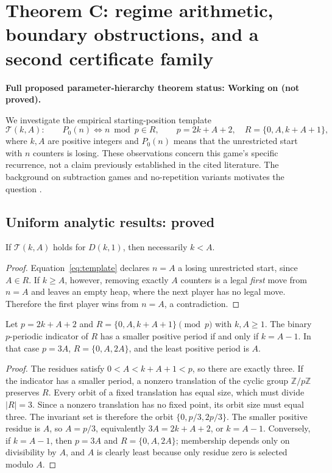 \section{Theorem C: regime arithmetic, boundary obstructions, and a second certificate family}\label{sec:C}
\textbf{Full proposed parameter-hierarchy theorem status: Working on (not proved).}

We investigate the empirical starting-position template
\begin{equation}\label{eq:template}
\mathcal{T}(k,A):\qquad P_0(n)\iff n\bmod p\in R,\qquad
p=2k+A+2,\quad R=\{0,A,k+A+1\},
\end{equation}
where $k,A$ are positive integers and $P_0(n)$ means that the unrestricted start with $n$ counters is losing. These observations concern this game's specific recurrence, not a claim previously established in the cited literature. The background on subtraction games and no-repetition variants motivates the question \cite{winningways2001,gurvich2012}.

\subsection{Uniform analytic results: proved}
\begin{proposition}\label{prop:Cupper}
If $\mathcal{T}(k,A)$ holds for $D(k,1)$, then necessarily $k<A$.
\end{proposition}
\begin{proof}
Equation~\eqref{eq:template} declares $n=A$ a losing unrestricted start, since $A\in R$. If $k\ge A$, however, removing exactly $A$ counters is a legal \emph{first} move from $n=A$ and leaves an empty heap, where the next player has no legal move. Therefore the first player wins from $n=A$, a contradiction.
\end{proof}

\begin{proposition}\label{prop:Ccollapse}
Let $p=2k+A+2$ and $R=\{0,A,k+A+1\}\pmod p$ with $k,A\ge1$. The binary $p$-periodic indicator of $R$ has a smaller positive period if and only if $k=A-1$. In that case $p=3A$, $R=\{0,A,2A\}$, and the least positive period is $A$.
\end{proposition}
\begin{proof}
The residues satisfy $0<A<k+A+1<p$, so there are exactly three. If the indicator has a smaller period, a nonzero translation of the cyclic group $\mathbb Z/p\mathbb Z$ preserves $R$. Every orbit of a fixed translation has equal size, which must divide $|R|=3$. Since a nonzero translation has no fixed point, its orbit size must equal three. The invariant set is therefore the orbit $\{0,p/3,2p/3\}$. The smaller positive residue is $A$, so $A=p/3$, equivalently $3A=2k+A+2$, or $k=A-1$. Conversely, if $k=A-1$, then $p=3A$ and $R=\{0,A,2A\}$; membership depends only on divisibility by $A$, and $A$ is clearly least because only residue zero is selected modulo $A$.
\end{proof}

